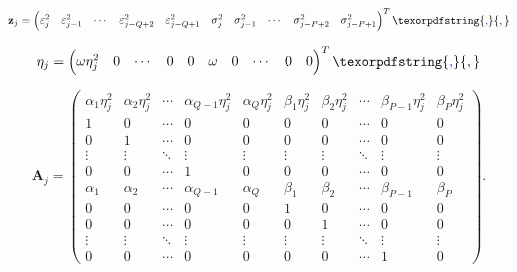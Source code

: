 \documentclass[10pt,a4paper,oneside]{article}
\providecommand{\DIFaddtex}[1]{{\protect\color{blue} \sf #1}} %
\providecommand{\DIFaddbegin}{} %
\providecommand{\DIFaddend}{} %
\providecommand{\DIFadd}[1]{\texorpdfstring{\DIFaddtex{#1}}{#1}} %
\newcommand{\DIFaddincludegraphics}[2][]{{\color{blue}\fbox{\DIFOincludegraphics[#1]{#2}}}} %
\DeclareRobustCommand{\DIFaddbegin}{\DIFOaddbegin \let\includegraphics\DIFaddincludegraphics} %
\DeclareRobustCommand{\DIFaddend}{\DIFOaddend \let\includegraphics\DIFOincludegraphics} %
\begin{document}
\[
    \mathbf{z}_j =
    \begin{pmatrix}
        \varepsilon_j^2 & \varepsilon_{j - 1}^2 & \cdots & \varepsilon_{j - Q + 2}^2 & \varepsilon_{j - Q + 1}^2 & \sigma^2_{j} & \sigma^2_{j - 1} & \cdots & \sigma^2_{j - P + 2} & \sigma^2_{j - P + 1} \\
    \end{pmatrix}^T\DIFaddbegin \DIFadd{,
}\DIFaddend \]


\[
    \mathbf{\eta}_j =
    \begin{pmatrix}
        \omega \eta_j^2 & 0 & \cdots & 0 & 0 & \omega & 0 & \cdots & 0 & 0 \\
    \end{pmatrix}^T\DIFaddbegin \DIFadd{,
}\DIFaddend \]


\[
    \mathbf{A}_j =
    \begin{pmatrix}
        \alpha_1 \eta_j^2 & \alpha_2 \eta_j^2 & \cdots & \alpha_{Q - 1} \eta_j^2 & \alpha_Q \eta_j^2 & \beta_1 \eta_j^2 & \beta_2 \eta_j^2 & \cdots & \beta_{P - 1} \eta_j^2 & \beta_P \eta_j^2 \\
        1                 & 0                 & \cdots & 0                       & 0                 & 0                & 0                & \cdots & 0                      & 0                \\
        0                 & 1                 & \cdots & 0                       & 0                 & 0                & 0                & \cdots & 0                      & 0                \\
        \vdots            & \vdots            & \ddots & \vdots                  & \vdots            & \vdots           & \vdots           & \ddots & \vdots                 & \vdots           \\
        0                 & 0                 & \cdots & 1                       & 0                 & 0                & 0                & \cdots & 0                      & 0                \\
        \alpha_1          & \alpha_2          & \cdots & \alpha_{Q - 1}          & \alpha_Q          & \beta_1          & \beta_2          & \cdots & \beta_{P - 1}          & \beta_P          \\
        0                 & 0                 & \cdots & 0                       & 0                 & 1                & 0                & \cdots & 0                      & 0                \\
        0                 & 0                 & \cdots & 0                       & 0                 & 0                & 1                & \cdots & 0                      & 0                \\
        \vdots            & \vdots            & \ddots & \vdots                  & \vdots            & \vdots           & \vdots           & \ddots & \vdots                 & \vdots           \\
        0                 & 0                 & \cdots & 0                       & 0                 & 0                & 0                & \cdots & 1                      & 0
    \end{pmatrix}.
\]
\end{document}
